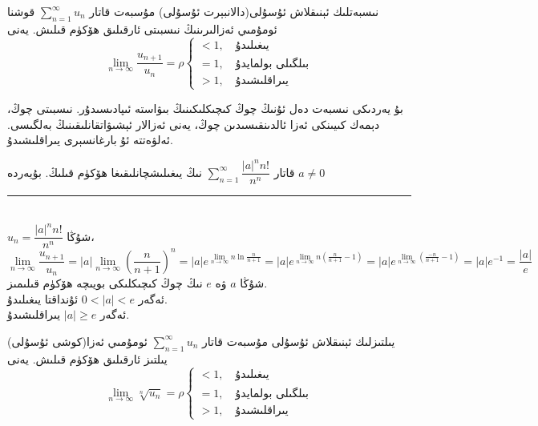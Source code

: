 \begin{MyTheorem}{نىسبەتلىك ئېنىقلاش ئۇسۇلى(دالانبېرت ئۇسۇلى)}{}%
	مۇسبەت قاتار
	$\sum\limits_{n=1}^\infty u_n$
	قوشنا ئومۇمىي ئەزالىرىنىڭ نىسبىتى ئارقىلىق ھۆكۈم قىلىش. يەنى
	$$
	\lim\limits_{n \to \infty} \frac{u_{n+1}}{u_n}= \rho \left\{\begin{array}{l}
		< 1, \quad \text{يىغىلىدۇ}\\
		= 1, \quad \text{بىلگىلى بولمايدۇ}\\
		> 1, \quad \text{يىراقلىشىدۇ}
	\end{array}\right.
	$$
\end{MyTheorem}
بۇ يەردىكى نىسبەت دەل ئۇنىڭ چوڭ كىچىكلىكىنىڭ بىۋاستە ئىپادىسىدۇر. نىسبىتى چوڭ، دېمەك كىيىنكى ئەزا ئالدىنقىسىدىن چوڭ، يەنى ئەزالار ئېشىۋاتقانلىقىنىڭ بەلگىسى. ئەلۋەتتە ئۇ بارغانسېرى يىراقلىشىدۇ.
\begin{myexample}
	 قاتار
	$\sum\limits_{n=1}^\infty\dfrac{\vert a\vert^nn!}{n^n}$
	نىڭ يىغىلىشچانلىقىغا ھۆكۈم قىلىڭ. بۇيەردە 
	$a \neq 0$
	\\\rule{\linewidth}{0.05em}\\
	$u_n=\dfrac{\vert a\vert^nn!}{n^n}$
	شۇڭا،\\
	$\lim\limits_{n\to\infty}\dfrac{u_{n+1}}{u_n}=\vert a\vert\lim\limits_{n\to\infty}\left(\dfrac{n}{n+1}\right)^n=\vert a\vert e^{\lim\limits_{n\to\infty}n\ln\frac{n}{n+1}}=\vert a\vert e^{\lim\limits_{n\to\infty}n(\frac{n}{n+1}-1)}=\vert a\vert e^{\lim\limits_{n\to\infty}(\frac{-n}{n+1}-1)}=\vert a\vert e^{-1}=\dfrac{\vert a\vert}{e}$\\
	شۇڭا $a$ ۋە $e$ نىڭ چوڭ كىچىكلىكى بويىچە ھۆكۈم قىلىمىز.\\
	ئەگەر
	$0<\vert a\vert<e$
	ئۇنداقتا يىغىلىدۇ.\\
	ئەگەر
	$\vert a\vert \ge e$
	يىراقلىشىدۇ.
\end{myexample}

\begin{MyTheorem}{(كوشى ئۇسۇلى)يىلتىزلىك ئېنىقلاش ئۇسۇلى}{}%
	مۇسبەت قاتار
	$\sum\limits_{n=1}^\infty u_n$
	ئومۇمىي ئەزا يىلتىز ئارقىلىق ھۆكۈم قىلىش. يەنى
	$$
	\lim\limits_{n \to \infty} \sqrt[n]{u_n}= \rho \left\{\begin{array}{l}
		< 1, \quad \text{يىغىلىدۇ}\\
		= 1, \quad \text{بىلگىلى بولمايدۇ}\\
		> 1, \quad \text{يىراقلىشىدۇ}
	\end{array}\right.
	$$
\end{MyTheorem}

